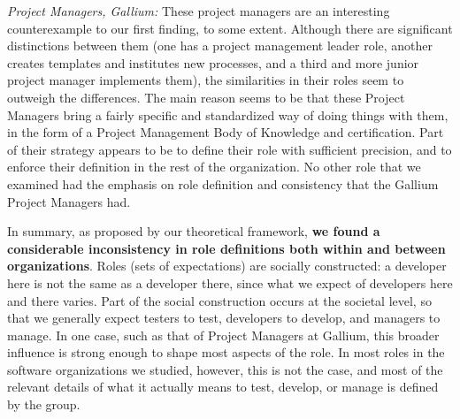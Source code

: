 \documentclass[10pt, conference, compsocconf]{IEEEtran}
\begin{document}
\emph{Project Managers, Gallium:} These project managers are an interesting counterexample to our first finding, to some extent. Although there are significant distinctions between them (one has a project management leader role, another creates templates and institutes new processes, and a third and more junior project manager implements them), the similarities in their roles seem to outweigh the differences. The main reason seems to be that these Project Managers bring a fairly specific and standardized way of doing things with them, in the form of a Project Management Body of Knowledge and certification. Part of their strategy appears to be to define their role with sufficient precision, and to enforce their definition in the rest of the organization. No other role that we examined had the emphasis on role definition and consistency that the Gallium Project Managers had.

In summary, as proposed by our theoretical framework, \textbf{we found a considerable inconsistency in role definitions both within and between organizations}. Roles (sets of expectations) are socially constructed: a developer here is not the same as a developer there, since what we expect of developers here and there varies. Part of the social construction occurs at the societal level, so that we generally expect testers to test, developers to develop, and managers to manage. In one case, such as that of Project Managers at Gallium, this broader influence is strong enough to shape most aspects of the role. In most roles in the software organizations we studied, however, this is not the case, and most of the relevant details of what it actually means to test, develop, or manage is defined by the group.




\end{document}
